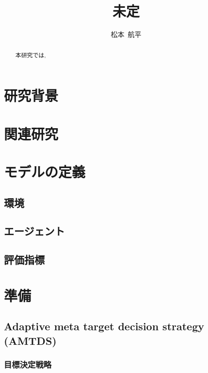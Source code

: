 \documentclass[12pt,a4j,twoside]{jarticle}
\title{未定}{5}
\author{松本~航平}
\begin{document}
\maketitle

\begin{abstract}
  本研究では,
\end{abstract}

\vspace*{1cm}\par
\section{研究背景}

\section{関連研究}

\section{モデルの定義}

\subsection{環境}

\subsection{エージェント}

\subsection{評価指標}

\section{準備}

\subsection{Adaptive meta target decision strategy (AMTDS)}
\label{subsec:AMTDS}

\subsubsection{目標決定戦略}
\label{target_strategy}
\end{document}
